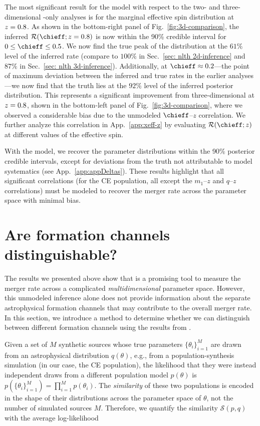 \begin{refsection}
The most significant result for the \Hybrid \PixelPop model with respect to the two- and three-dimensional \PixelPop-only analyses is for the marginal effective spin distribution at $z=0.8$. As shown in the bottom-right panel of Fig.~\ref{fig:3d-comparison}, the inferred $\mathcal{R}(\chieff;z=\ztwo)$ is now within the 90\% credible interval for $0 \leq \chieff \leq 0.5$. We now find the true peak of the distribution at the $61\%$ level of the inferred rate (compare to $100\%$ in Sec.~\ref{sec: nlth 2d-inference} and $87\%$ in Sec.~\ref{sec: nlth 3d-inference}). Additionally, at $\chieff\approx0.2$---the point of maximum deviation between the inferred and true rates in the earlier analyses---we now find that the truth lies at the $92\%$ level of the inferred posterior distribution. This represents a significant improvement from three-dimensional \PixelPop at $z=0.8$, shown in the bottom-left panel of Fig.~\ref{fig:3d-comparison}, where we observed a considerable bias due to the unmodeled $\chieff$--$z$ correlation. We further analyze this correlation in App.~\ref{app:xeff-z} by evaluating $\mathcal{R}(\chieff;z)$ at different values of the effective spin. 

With the \Hybrid \PixelPop model, we recover the parameter distributions within the 90\% posterior credible intervals, except for deviations from the truth not attributable to model systematics (see App.~\ref{app:appDeltas}). These results highlight that all significant correlations (for the \ac{CE} population, all except the $m_1$--$z$ and $q$--$z$ correlations) must be modeled to recover the merger rate across the parameter space with minimal bias. 

\section{Are formation channels distinguishable?}
\label{sec: nlth cross-entropy}

The results we presented above show that \PixelPop is a promising tool to measure the merger rate across a complicated \textit{multidimensional} parameter space. However, this unmodeled inference alone does not provide information about the separate astrophysical formation channels that may contribute to the overall merger rate. In this section, we introduce a method
to determine whether we can distinguish between different formation channels using the results from \PixelPop. 

Given a set of $M$ synthetic sources whose true parameters $\{\theta_i\}_{i=1}^M$  are drawn from an astrophysical distribution $q(\theta)$, e.g., from a population-synthesis simulation (in our case, the \ac{CE} population), the likelihood that they were instead independent draws from a different population model $p(\theta)$ is $p (\{\theta_i\}_{i=1}^M) = \prod_{i=1}^M p(\theta_i)$. The \textit{similarity} of these two populations is encoded in the shape of their distributions across the parameter space of $\theta$, not the number of simulated sources $M$. Therefore, we quantify the similarity $\mathcal{S}(p,q)$ with the average log-likelihood


\end{refsection}
